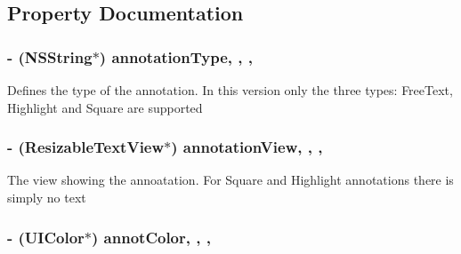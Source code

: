 \subsection{Property Documentation}
\hypertarget{interface_a_p_d_f_annotation_a0151ed813f0043344ffc890de7f3d000}{
\subsubsection[{annotation\-Type}]{\setlength{\rightskip}{0pt plus 5cm}-\/ (N\-S\-String$\ast$) annotation\-Type\hspace{0.3cm}{\ttfamily [read]}, {\ttfamily [write]}, {\ttfamily [nonatomic]}, {\ttfamily [retain]}}}\label{interface_a_p_d_f_annotation_a0151ed813f0043344ffc890de7f3d000}
Defines the type of the annotation. In this version only the three types\-: Free\-Text, Highlight and Square are supported \hypertarget{interface_a_p_d_f_annotation_aa2b404a57629cd6728d4a59d3e762fb7}{
\subsubsection[{annotation\-View}]{\setlength{\rightskip}{0pt plus 5cm}-\/ ({\bf Resizable\-Text\-View}$\ast$) annotation\-View\hspace{0.3cm}{\ttfamily [read]}, {\ttfamily [write]}, {\ttfamily [nonatomic]}, {\ttfamily [retain]}}}\label{interface_a_p_d_f_annotation_aa2b404a57629cd6728d4a59d3e762fb7}
The view showing the annoatation. For Square and Highlight annotations there is simply no text \hypertarget{interface_a_p_d_f_annotation_a9cab5deed33c003423446b122356a8f6}{
\subsubsection[{annot\-Color}]{\setlength{\rightskip}{0pt plus 5cm}-\/ (U\-I\-Color$\ast$) annot\-Color\hspace{0.3cm}{\ttfamily [read]}, {\ttfamily [write]}, {\ttfamily [nonatomic]}, {\ttfamily [retain]}}}\label{interface_a_p_d_f_annotation_a9cab5deed33c003423446b122356a8f6}
